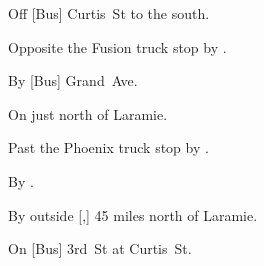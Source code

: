 
\begin{LocationList}

Off [Bus] Curtis~St to the south.

Opposite the Fusion truck stop by  .

By [Bus] Grand~Ave.

On   just north of Laramie.

Past the Phoenix truck stop by  .

\Location{\TruckStop \Gas \Rest \Service \Weigh}
By  .

By  outside [,] 45 miles north of Laramie.

On [Bus] 3rd~St at Curtis~St.

\end{LocationList}
